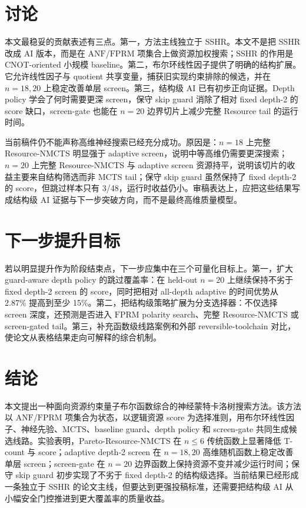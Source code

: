 \documentclass[UTF8,fontset=macnew,11pt]{ctexart}
\newcommand{\method}{Resource-NMCTS}
\newcommand{\pareto}{Pareto-Resource-NMCTS}
\newcommand{\anf}{\ensuremath{\mathrm{ANF}}}
\newcommand{\fprm}{\ensuremath{\mathrm{FPRM}}}
\newcommand{\mcts}{\ensuremath{\mathrm{MCTS}}}
\begin{document}
\section{讨论}

本文最稳妥的贡献表述有三点。第一，方法主线独立于 SSHR。本文不是把 SSHR 改成 AI 版本，而是在 \anf{}/\fprm{} 项集合上做资源加权搜索；SSHR 的作用是 CNOT-oriented 小规模 baseline。第二，布尔环线性因子提供了明确的结构扩展。它允许线性因子与 quotient 共享变量，捕获旧实现约束排除的候选，并在 $n=18,20$ 上稳定改善单层 screen。第三，结构级 AI 已有初步正向证据。Depth policy 学会了何时需要更深 screen，保守 skip guard 消除了相对 fixed depth-2 的 score 缺口，screen-gate 也能在 $n=20$ 边界切片上减少完整 Resource tail 的运行时间。

当前稿件仍不能声称高维神经搜索已经充分成功。原因是：$n=18$ 上完整 \method{} 明显强于 adaptive screen，说明中等高维仍需要更深搜索；$n=20$ 上完整 \method{} 与 adaptive screen 资源持平，说明该切片的收益主要来自结构筛选而非 MCTS tail；保守 skip guard 虽然保持了 fixed depth-2 的 score，但跳过样本只有 3/48，运行时收益仍小。审稿表达上，应把这些结果写成结构级 AI 证据与下一步突破方向，而不是最终高维质量模型。

\section{下一步提升目标}

若以明显提升作为阶段结束点，下一步应集中在三个可量化目标上。第一，扩大 guard-aware depth policy 的跳过覆盖率：在 held-out $n=20$ 上继续保持不劣于 fixed depth-2 screen 的 score，同时把相对 all-depth adaptive 的时间优势从 2.87\% 提高到至少 15\%。第二，把结构级策略扩展为分支选择器：不仅选择 screen 深度，还预测是否进入 \fprm{} polarity search、完整 \method{} 或 screen-gated tail。第三，补充函数级线路案例和外部 reversible-toolchain 对比，使论文从表格结果走向可解释的综合机制。

\section{结论}

本文提出一种面向资源约束量子布尔函数综合的神经蒙特卡洛树搜索方法。该方法以 \anf{}/\fprm{} 项集合为状态，以逻辑资源 score 为选择准则，用布尔环线性因子、神经先验、\mcts{}、baseline guard、depth policy 和 screen-gate 共同生成候选线路。实验表明，\pareto{} 在 $n\leq6$ 传统函数上显著降低 T-count 与 score；adaptive depth-2 screen 在 $n=18,20$ 高维随机函数上稳定改善单层 screen；screen-gate 在 $n=20$ 边界函数上保持资源不变并减少运行时间；保守 skip guard 初步实现了不劣于 fixed depth-2 的结构级选择。当前结果已经形成一条独立于 SSHR 的论文主线，但要达到更强投稿标准，还需要把结构级 AI 从小幅安全门控推进到更大覆盖率的质量收益。
\end{document}
